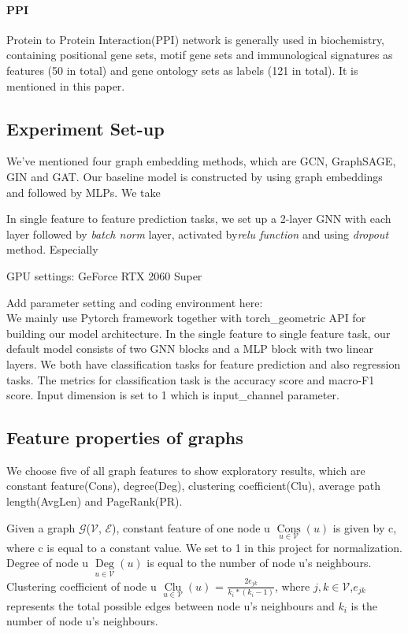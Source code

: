 \documentclass[sigconf]{acmart}
\begin{document}
\paragraph{PPI}
Protein to Protein Interaction(PPI) network is generally used in biochemistry, containing positional gene sets, motif gene sets and immunological signatures as features (50 in total) and gene ontology sets as labels (121 in total). It is mentioned in this paper. 

\subsection{Experiment Set-up}
We've mentioned four graph embedding methods, which are GCN, GraphSAGE, GIN and GAT. 
Our baseline model is constructed by using graph embeddings and followed by MLPs. We take 

In single feature to feature prediction tasks, we set up a 2-layer GNN with each layer followed by \textit{batch norm}
layer, activated by\textit{relu function} and using \textit{dropout} method. Especially  

GPU settings: GeForce RTX 2060 Super



Add parameter setting and coding environment here:\\

We mainly use Pytorch framework together with torch\_geometric API for building our model architecture.  In the single feature to single feature task, our default model consists of two GNN blocks and a MLP block with two linear layers. We both have classification tasks for feature prediction and also regression tasks. The metrics for classification task is the accuracy score and macro-F1 score. Input dimension is set to 1 which is input\_channel parameter. 

\subsection{Feature properties of graphs}
We choose five of all graph features to show exploratory results, which are constant feature(Cons), degree(Deg), clustering coefficient(Clu), average path length(AvgLen) and PageRank(PR).

Given a graph $\mathcal{G}$($\mathcal{V}$, $\mathcal{E}$), constant feature of one node u $\mathop{Cons}\limits_{u \in \mathcal{V}}(u)$ is given by c, where c is equal to a constant value. We set to 1 in this project for normalization. Degree of node u $\mathop{Deg}\limits_{u \in \mathcal{V}}(u)$ is equal to the number of node u's neighbours. Clustering coefficient of node u $\mathop{Clu}\limits_{u \in \mathcal{V}}(u)$ = $\frac{2e_{jk}}{k_{i} * (k_{i} - 1)}$, where $j,k \in \mathcal{V}$,$e_{jk}$ represents the total possible edges between node u's neighbours and $k_{i}$ is the number of node u's neighbours.
\end{document}
